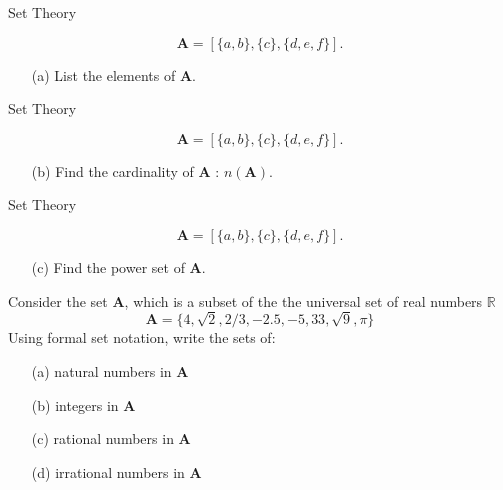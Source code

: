 \documentclass[11pt,a4paper,titlepage,oneside,openany]{article}
\numberwithin{equation}{section}
\numberwithin{algorithm}{section}
\numberwithin{figure}{section}
\numberwithin{table}{section}
\begin{document}
{%

{Set Theory}

\[\boldsymbol{A} = [\{a, b\}, \{c\},\{d, e, f \}]. \]
\begin{itemize}
\item[(a)] List the elements of \textbf{A}. 
\end{itemize}




{Set Theory}

\[\boldsymbol{A} = [\{a, b\}, \{c\},\{d, e, f \}]. \]
\begin{itemize}
\item[(b)] Find the cardinality of \textbf{A} : $n(\boldsymbol{A})$. 
\end{itemize}



{Set Theory}

\[\boldsymbol{A} = [\{a, b\}, \{c\},\{d, e, f \}]. \]
\begin{itemize}
\item[(c)] Find the power set of \textbf{A}. 
\end{itemize}





Consider the set \textbf{A}, which is a subset of the the universal set of real numbers $\mathbb{R}$
 \[\boldsymbol{A} = \{4, \sqrt{2}, 2/3, -2.5, -5, 33, \sqrt{9}, \pi \}\]
Using formal set notation, write the sets of:
\begin{itemize}
\item[(a)] natural numbers in \textbf{A}
\item[(b)] integers in \textbf{A}
\item[(c)] rational numbers in \textbf{A}
\item[(d)] irrational numbers in \textbf{A}
\end{itemize}



}
\end{document}
